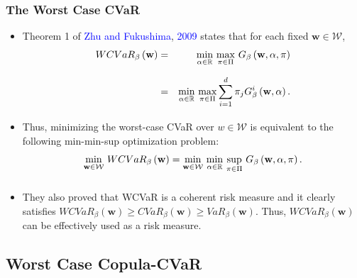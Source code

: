 \documentclass[pdf,10pt,xcolor=dvipsnames,hide notes]{beamer}
\begin{document}
\begin{frame}[label=frame2f]
	\frametitle{The Worst Case CVaR}
	
	\begin{itemize}
		\justifying
		
		\item Theorem 1 of 	\textcolor{blue}{Zhu and Fukushima}, \textcolor{blue}{2009} states that for each fixed $%
		\mathbf{w}\in \mathcal{W}$,
		\begin{eqnarray}
		WCVaR_{\beta }\left( \mathbf{w}\right) &=&\underset{}{\underset{\alpha \in
				\mathbb{R}
			}{\min }~\underset{\pi \in \Pi }{\max }}~G_{\beta }\left( \mathbf{w},\alpha
		,\pi \right)  \notag \\
		&=&\underset{}{\underset{\alpha \in
				\mathbb{R}
			}{\min }~\underset{\pi \in \Pi }{\max }}\sum_{i=1}^{d}\pi _{j}G_{\beta
		}^{i}\left( \mathbf{w},\alpha \right) .  \label{18}
		\end{eqnarray}%
		
	\vspace{0.3cm}
		
	\item Thus, minimizing the worst-case CVaR over $w\in \mathcal{W}$ is equivalent
		to the following min-min-sup optimization problem:
		\begin{equation}
		\underset{}{\underset{\mathbf{w}\in \mathcal{W}}{\min }}~WCVaR_{\beta
		}\left( \mathbf{w}\right) =\underset{}{\underset{\mathbf{w}\in \mathcal{W}}{%
				\min }~\underset{\alpha \in
				\mathbb{R}
			}{\min }~\underset{\pi \in \Pi }{\sup }}~G_{\beta }\left( \mathbf{w},\alpha
		,\pi \right) .  \label{19}
		\end{equation}%
		
		\vspace{0.3cm}
		
		
		\item They also proved that WCVaR is a coherent risk measure and
		it clearly satisfies $WCVaR_{\beta }\left( \mathbf{w}\right) \geq
		CVaR_{\beta }\left( \mathbf{w}\right) \geq VaR_{\beta }\left( \mathbf{w}%
		\right) $. Thus, $WCVaR_{\beta }\left( \mathbf{w}\right) $ can be
		effectively used as a risk measure.
		
	\end{itemize}
	
	\end{frame}


\subsection{Worst Case Copula-CVaR}
\end{document}
